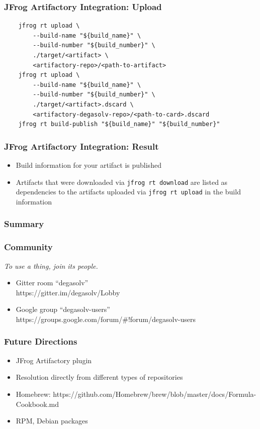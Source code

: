 \documentclass{beamer}
\begin{document}
\begin{frame}[fragile]
\frametitle{JFrog Artifactory Integration: Upload}
\begin{verbatim}
    jfrog rt upload \
        --build-name "${build_name}" \
        --build-number "${build_number}" \
        ./target/<artifact> \
        <artifactory-repo>/<path-to-artifact>
    jfrog rt upload \
        --build-name "${build_name}" \
        --build-number "${build_number}" \
        ./target/<artifact>.dscard \
        <artifactory-degasolv-repo>/<path-to-card>.dscard
    jfrog rt build-publish "${build_name}" "${build_number}"

\end{verbatim}
\end{frame}
\begin{frame}
  \frametitle{JFrog Artifactory Integration: Result}
  \begin{itemize}
  \item Build information for your artifact is published
  \item Artifacts that were downloaded via \texttt{jfrog rt download} are listed as
    dependencies to the artifacts uploaded via \texttt{jfrog rt upload} in the build
    information
  \end{itemize}
\end{frame}
\begin{frame}
  \frametitle{Summary}
\end{frame}
\begin{frame}
  \frametitle{Community}
  \textit{To use a thing, join its people.}

  \break

  \begin{itemize}
  \item Gitter room ``degasolv'' \\
    https://gitter.im/degasolv/Lobby
  \item Google group ``degasolv-users'' \\
    https://groups.google.com/forum/\#!forum/degasolv-users
  \end{itemize}
\end{frame}
\begin{frame}
  \frametitle{Future Directions}
  \begin{itemize}
  \item JFrog Artifactory plugin
  \item Resolution directly from different types of repositories
  \item Homebrew: https://github.com/Homebrew/brew/blob/master/docs/Formula-Cookbook.md
  \item RPM, Debian packages
  \end{itemize}
\end{frame}
\end{document}
